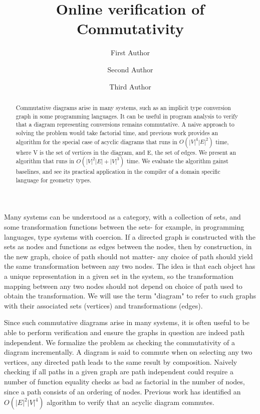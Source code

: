 \documentclass[runningheads]{llncs}
\begin{document}
%
\title{Online verification of Commutativity}
%
%
\author{First Author \and
Second Author \and
Third Author}
%
%
%
\maketitle              %
%
\begin{abstract}
Commutative diagrams arise in many systems, such as an implicit type conversion graph in some programming languages.
It can be useful in program analysis to verify that a diagram representing conversions remains commutative.
A naive approach to solving the problem would take factorial time, and previous work provides an algorithm for the special case of acyclic diagrams that runs in $O(|V|^4|E|^2)$ time, where V is the set of vertices in the diagram, and E, the set of edges. 
We present an algorithm that runs in $O(|V|^2|E| + |V|^3)$ time. We evaluate the algorithm gainst baselines, and see its practical application in the compiler of a domain specific language for geometry types.

\end{abstract}
%
%
%
Many systems can be understood as a category, with a collection of sets, and some transformation functions between the sets- for example, in programming languages, type systems with coercion. If a directed graph is constructed with the sets as nodes and functions as edges between the nodes, then by construction, in the new graph, choice of path should not matter- any choice of path should yield the same transformation between any two nodes. The idea is that each object has a unique representation in a given set in the system, so the transformation mapping between any two nodes should not depend on choice of path used to obtain the transformation. We will use the term "diagram" to refer to such graphs with their associated sets (vertices) and transformations (edges).

Since such commutative diagrams arise in many systems, it is often useful to be able to perform verification and ensure the graphs in question are indeed path independent. 
We formalize the problem as checking the commutativity of a diagram incrementally.
A diagram is said to commute when on selecting any two vertices, any directed path leads to the same result by composition.
Naively checking if all paths in a given graph are path independent could require a number of function equality checks as bad as factorial in the number of nodes, since a path consists of an ordering of nodes. Previous work has identified an $O(|E|^2|V|^4)$ algorithm to verify that an acyclic diagram commutes.
\end{document}
